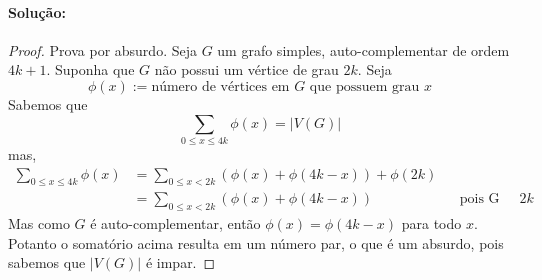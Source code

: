 \documentclass[11pt,a4paper,notitlepage]{exam}
\begin{document}
\paragraph*{Solução:}
\begin{proof}
  Prova por absurdo. Seja $G$ um grafo simples, auto-complementar de ordem $4k + 1$. Suponha que $G$ não possui um vértice de grau $2k$.
  Seja $$\phi(x) := \text{número de vértices em $G$ que possuem grau $x$}$$
  Sabemos que $$\sum_{0\leq x\leq 4k}\phi(x) = |V(G)|$$
  mas,
  \begin{align*}
    \sum_{0\leq x\leq 4k}\phi(x) & = \sum_{0\leq x< 2k}(\phi(x) + \phi(4k - x)) + \phi(2k)                                                     \\
                                 & = \sum_{0\leq x< 2k}(\phi(x) + \phi(4k - x))            &  & \text{pois G não possui vértice com grau $2k$}
  \end{align*}
  Mas como $G$ é auto-complementar, então $\phi(x) = \phi(4k -x)$ para todo $x$. Potanto o somatório acima resulta em um número par, o que é um absurdo, pois sabemos que $|V(G)|$ é impar.

\end{proof}
\end{document}
